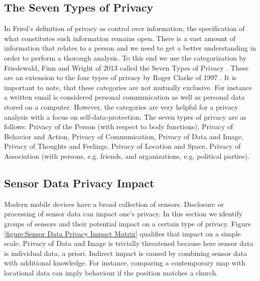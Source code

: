 \documentclass[runningheads,a4paper]{llncs}
\begin{document}
\subsection{The Seven Types of Privacy}
\label{sec:privacytypes}

In Fried's definition of privacy as control over information, the specification of what constitutes such information remains open. There is a vast amount of information that relates to a person and we need to get a better understanding in order to perform a thorough analysis. To this end we use the categorization by Friedewald, Finn and Wright of 2013 called the Seven Types of Privacy \cite{7ToP}. These are an extension to the four types of privacy by Roger Clarke of 1997 \cite{RClarke:4ToP}. It is important to note, that these categories are not mutually exclusive. For instance a written email is considered personal communication as well as personal data stored on a computer. However, the categories are very helpful for a privacy analysis with a focus on self-data-protection.
The seven types of privacy are as follows: Privacy of the Person (with respect to body functions), Privacy of Behavior and Action, Privacy of Communication, Privacy of Data and Image, Privacy of Thoughts and Feelings, Privacy of Location and Space, Privacy of Association (with persons, e.g. friends, and organizations, e.g. political parties).




\subsection{Sensor Data Privacy Impact}
\label{sec:SensorPrivacyImpact}

Modern mobile devices have a broad collection of sensors.
Disclosure or processing of sensor data can impact one's privacy.
In this section we identify groups of sensors and their potential impact on a certain type of privacy.
Figure \ref{figure:Sensor Data Privacy Impact Matrix} qualifies that impact on a simple scale.
Privacy of Data and Image is trivially threatened because here sensor data is individual data, a priori.
Indirect impact is caused by combining sensor data with additional knowledge.
For instance, comparing a contemporary map with locational data can imply behaviour if the position matches a church.
\end{document}
